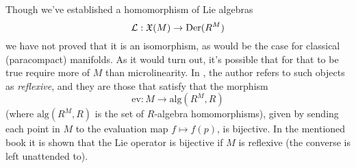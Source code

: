 Though we've established a homomorphism of Lie algebras
\begin{equation*}
  \mathcal L:\mathfrak X(M)\to \operatorname{Der}(R^M)
\end{equation*}
we have not proved that it is an isomorphism, as would be the case for classical (paracompact) manifolds. As it would turn out, it's possible that for that to be true require more of \( M \) than microlinearity. In \cite{lav96}, the author refers to such objects as \emph{reflexive}, and they are those that satisfy that the morphism
\begin{equation*}
  \text{ev}:M \to {\text{alg}(R^M,R)}
\end{equation*}
(where \( \text{alg}(R^M,R) \) is the set of \( R \)-algebra homomorphisms), given by sending each point in \( M \) to the evaluation map \( f\mapsto f(p) \), is bijective. In the mentioned book it is shown that the Lie operator is bijective if \( M \) is reflexive (the converse is left unattended to).
